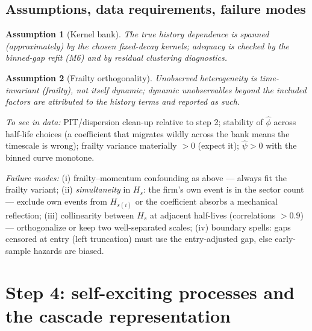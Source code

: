 \documentclass[11pt]{article}
\newtheorem{assumption}{Assumption}
\numberwithin{assumption}{section}
\numberwithin{proposition}{section}
\numberwithin{remark}{section}
\begin{document}
\subsection{Assumptions, data requirements, failure modes}
\begin{assumption}[Kernel bank]\label{as:s3_kernel}
The true history dependence is spanned (approximately) by the chosen
fixed-decay kernels; adequacy is checked by the binned-gap refit
(M6) and by residual clustering diagnostics.
\end{assumption}
\begin{assumption}[Frailty orthogonality]\label{as:s3_frailty}
Unobserved heterogeneity is time-invariant (frailty), not itself dynamic;
dynamic unobservables beyond the included factors are attributed to the
history terms and reported as such.
\end{assumption}

\emph{To see in data:} PIT/dispersion clean-up relative to step 2;
stability of $\hat\phi$ across half-life choices (a coefficient that
migrates wildly across the bank means the timescale is wrong); frailty
variance materially $>0$ (expect it); $\hat\psi>0$ with the binned curve
monotone.

\emph{Failure modes:}
(i) frailty--momentum confounding as above --- always fit the frailty
variant;
(ii) \emph{simultaneity} in $H_s$: the firm's own event is in the sector
count --- exclude own events from $H_{s(i)}$ or the coefficient absorbs a
mechanical reflection;
(iii) collinearity between $H_s$ at adjacent half-lives (correlations
$>0.9$) --- orthogonalize or keep two well-separated scales;
(iv) boundary spells: gaps censored at entry (left truncation) must use the
entry-adjusted gap, else early-sample hazards are biased.

\section{Step 4: self-exciting processes and the cascade representation}
\label{sec:step4}
\end{document}
